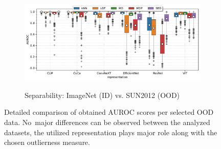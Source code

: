 \begin{figure}[t]
    \vspace{-0.5em}
    \begin{subfigure}[b]{0.9\textwidth}
        \centering
        \caption{\small Separability: ImageNet (ID) vs. SUN2012 (OOD)}
        \includegraphics[width=\textwidth]{images/real-separability/barplot-ImageNet-auroc(representation,model)-representation_CLIP,CoCa,ConvNeXT,EfficientNet,ResNet,ViT-class_0,999-data_SUN2012.pdf}
        \label{fig:image-auroc-sun2012}
    \end{subfigure}
    \vspace{-0.5em}
    \caption{Detailed comparison of obtained AUROC scores per selected OOD data. No~major differences can be observed between the analyzed datasets, the utilized representation plays major role along with the chosen outlierness measure.}
    \label{fig:image-auroc-detailed}
\end{figure}

